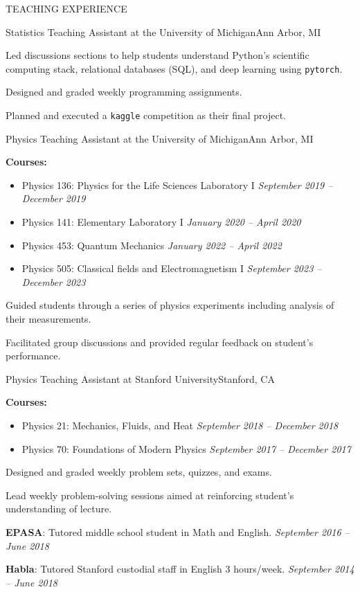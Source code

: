 \documentclass{resume} %
\newcommand{\pytorch}[0]{\texttt{pytorch}}
\begin{document}
\begin{rSection}{TEACHING EXPERIENCE}
\begin{rSubsection}{Statistics Teaching Assistant at the University of Michigan}{Ann Arbor, MI}{}{}
\item Led discussions sections to help students understand Python's scientific computing stack, relational databases (SQL), and deep learning using \pytorch.
\item Designed and graded weekly programming assignments.
\item Planned and executed a \texttt{kaggle} competition as their final project.
%
\end{rSubsection} 
%
\begin{rSubsection}{Physics Teaching Assistant at the University of Michigan}{Ann Arbor, MI}{}{}
\item \textbf{Courses:}
%
    \begin{itemize}[itemsep=-0.4em]
        \vspace*{-0.5em}
        \item Physics 136: Physics for the Life Sciences Laboratory I \hfill \textit{September 2019 -- December 2019}
        \item Physics 141: Elementary Laboratory I \hfill \textit{January 2020 -- April 2020}
        \item Physics 453: Quantum Mechanics \hfill \textit{January 2022 -- April 2022}
        \item Physics 505: Classical fields and Electromagnetism I \hfill \textit{September 2023 -- December 2023}
    \end{itemize}
%
\item Guided students through a series of physics experiments including analysis of their measurements.
\item Facilitated group discussions and provided regular feedback on student's performance. 
\end{rSubsection} 
%
\begin{rSubsection}{Physics Teaching Assistant at Stanford University}{Stanford, CA}{}{}
\item \textbf{Courses:}
%
    \begin{itemize}[itemsep=-0.5em]
        \vspace*{-0.5em}
        \item Physics 21: Mechanics, Fluids, and Heat \hfill \textit{September 2018 -- December 2018}
        \item Physics 70: Foundations of Modern Physics \hfill \textit{September 2017 -- December 2017}
    \end{itemize}
%
\item Designed and graded weekly problem sets, quizzes, and exams. 
\item Lead weekly problem-solving sessions aimed at reinforcing student's understanding of lecture. 
%
\end{rSubsection} 
%
\textbf{EPASA}: Tutored middle school student in Math and English. \hfill {\em September 2016 -- June 2018}

\vspace*{-.15cm}
\textbf{Habla}: Tutored Stanford custodial staff in English 3 hours/week. \hfill {\em September 2014 -- June 2018}
\end{rSection}
\end{document}

